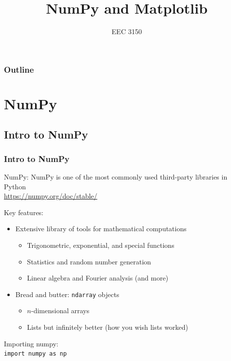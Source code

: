 \documentclass{beamer}
\title{NumPy and Matplotlib}
\author{EEC 3150}
\date{}
\institute{Trevecca Nazarene University}
\newcommand{\code}[1]{\texttt{#1}}
\begin{document}
\frame{\titlepage}
 
\begin{frame}	
	\frametitle{Outline}
	\tableofcontents	
\end{frame}


\section{NumPy}

\begin{frame}	
\end{frame}

\subsection{Intro to NumPy}

\begin{frame}	
	\frametitle{Intro to NumPy}
	
	\begin{block}{NumPy:}
		NumPy is one of the most commonly used third-party libraries in Python \\
		\href{https://numpy.org/doc/stable/}{https://numpy.org/doc/stable/}
		
		\vspace{10pt}
		Key features:
		\begin{itemize}
			\item Extensive library of tools for mathematical computations
			\begin{itemize}
				\item Trigonometric, exponential, and special functions
				\item Statistics and random number generation
				\item Linear algebra and Fourier analysis (and more)
			\end{itemize}
			\item Bread and butter: \code{ndarray} objects
			\begin{itemize}
				\item $n$-dimensional arrays
				\item Lists but infinitely better (how you wish lists worked)
			\end{itemize}
		\end{itemize}
		
		\vspace{10pt}
		Importing numpy: \\
		\code{import numpy as np}
	\end{block}
	
\end{frame}
\end{document}
